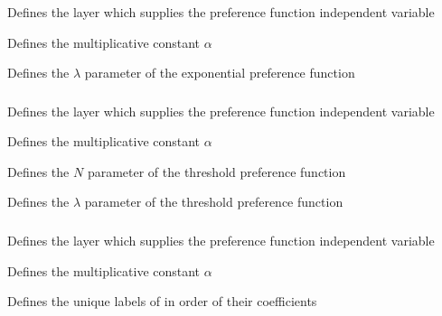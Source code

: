 \subsubsection[Exponential]{}

 {Defines the layer which supplies the preference function independent variable}

 {Defines the multiplicative constant $\alpha$}

 {Defines the $\lambda$ parameter of the exponential preference function}

\subsubsection[Threshold]{}

 {Defines the layer which supplies the preference function independent variable}

 {Defines the multiplicative constant $\alpha$}

 {Defines the $N$ parameter of the threshold preference function}

 {Defines the $\lambda$ parameter of the threshold preference function}

\subsubsection[Categorical]{}

 {Defines the layer which supplies the preference function independent variable}

 {Defines the multiplicative constant $\alpha$}

 {Defines the unique labels of  in order of their coefficients}

